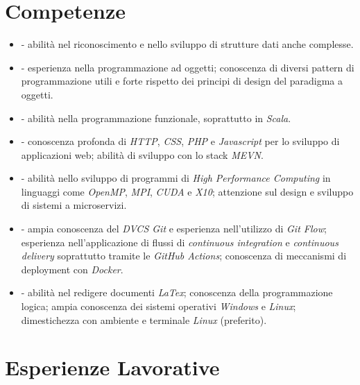 \documentclass[letterpaper]{template} %
\begin{document}
\section{Competenze}

\begin{itemize}
    \item {} - abilità nel riconoscimento e nello sviluppo di strutture dati anche complesse.
    \item {} - esperienza nella programmazione ad oggetti; conoscenza di diversi pattern di programmazione utili e forte rispetto dei principi di design del paradigma a oggetti.
    \item {} - abilità nella programmazione funzionale, soprattutto in \textit{Scala}.
    \item {} - conoscenza profonda di \textit{HTTP}, \textit{CSS}, \textit{PHP} e \textit{Javascript} per lo sviluppo di applicazioni web; abilità di sviluppo con lo stack \textit{MEVN}.
    \item {} - abilità nello sviluppo di programmi di \textit{High Performance Computing} in linguaggi come \textit{OpenMP}, \textit{MPI}, \textit{CUDA} e \textit{X10}; attenzione sul design e sviluppo di sistemi a microservizi.
    \item {} - ampia conoscenza del \textit{DVCS Git} e esperienza nell'utilizzo di \textit{Git Flow}; esperienza nell'applicazione di flussi di \textit{continuous integration} e \textit{continuous delivery} soprattutto tramite le \textit{GitHub Actions}; conoscenza di meccanismi di deployment con \textit{Docker}.
    \item {} - abilità nel redigere documenti \textit{LaTex}; conoscenza della programmazione logica; ampia conoscenza dei sistemi operativi \textit{Windows} e \textit{Linux}; dimestichezza con ambiente e terminale \textit{Linux} (preferito).
\end{itemize}

\section{Esperienze Lavorative}
\end{document}
